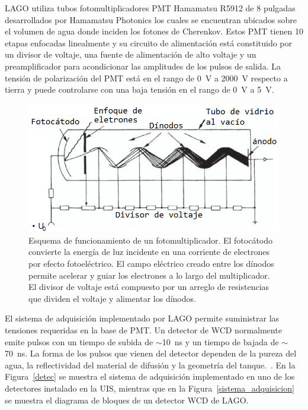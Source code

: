 LAGO utiliza tubos fotomultiplicadores PMT Hamamatsu R5912 de 8 pulgadas desarrollados por Hamamatsu Photonics los cuales se encuentran ubicados sobre el volumen de agua donde inciden los fotones de Cherenkov. 
Estos PMT tienen 10 etapas enfocadas linealmente y su circuito de alimentación está constituido por un divisor de voltaje, una fuente de alimentación de alto voltaje y un preamplificador para acondicionar las amplitudes de los pulsos de salida.
La tensión de polarización del PMT está en el rango de 0~V a 2000~V respecto a tierra y puede controlarse con una baja tensión en el rango de 0~V a 5~V.

\begin{figure}[H]
\includegraphics[scale=0.35]{Figs/pmtll.jpeg} 
\centering
\caption[Esquema de funcionamiento de un fotomultiplicador]{Esquema de funcionamiento de un fotomultiplicador.
El fotocátodo convierte la energía de luz incidente en una corriente de electrones por efecto fotoeléctrico.
El campo eléctrico creado entre los dínodos permite acelerar y guiar los electrones a lo largo del multiplicador.
El divisor de voltaje está compuesto por un arreglo de resistencias que dividen el voltaje y alimentar los dínodos.~\citep{hernandez2018procedimiento}}
\label{foto}
\end{figure}

El sistema de adquisición implementado por LAGO permite suministrar las tensiones requeridas en la base de PMT.
Un detector de WCD normalmente emite pulsos con un tiempo de subida de $\sim$10~ns y un tiempo de bajada de $\sim$70~ns.
La forma de los pulsos que vienen del detector dependen de la pureza del agua, la reflectividad del material de difusión y la geometría del tanque.~\citep{haro2016data}.
En la Figura~\ref{detec} se muestra el sistema de adquisición implementado en uno de los detectores instalado en la UIS, mientras que en la Figura~\ref{sistema_adquisicion} se muestra el diagrama de bloques de un detector WCD de LAGO.


